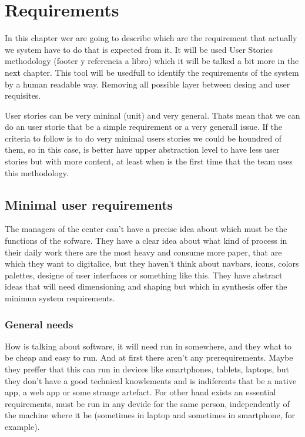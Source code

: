 \chapter{Requirements}

In this chapter wer are going to describe which are the requirement that
actually we system have to do that is expected from it.
It will be used User Stories methodology (footer y referencia a libro) which
it will be talked a bit more in the next chapter.
This tool will be usedfull to identify the requirements of the system by a
human readable way. Removing all possible layer between desing and user requisites.

User stories can be very mininal (unit) and very general. Thats mean that we
can do an user storie that be a simple requirement or a very generall issue.
If the criteria to follow is to do very minimal users stories we could be
houndred of them, so in this case, is better have upper abstraction level
to have less user stories but with more content, at least when is the
first time that the team uses this methodology.

\section{Minimal user requirements}

The managers of the center can't have a precise idea about which must be the functions of the sofware. They have a clear idea about what kind of process in their daily work there are the most heavy and consume more paper, that are which they want to digitalice, but they haven't think about navbars, icons, colors palettes, designe of user interfaces or something like this.  They have abstract ideas that will need dimensioning and shaping but which in synthesis offer the minimun system requirements.

\subsection{General needs}
How is talking about software, it will need run in somewhere, and they what to be cheap and easy to run. And at first there aren't any prerequirements. Maybe they preffer that this can run in devices like smartphones, tablets, laptops, but they don't have a good technical knowlements and is indiferents that be a native app, a web app or some strange artefact.
For other hand exists an essential requirements, must be run in any devide for the same person, independently of the machine where it be (sometimes in laptop and sometimes in smartphone, for example).

